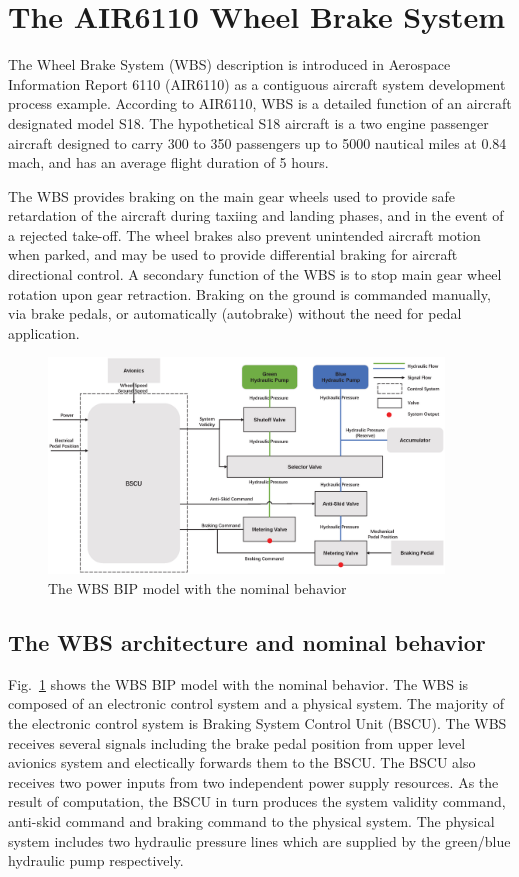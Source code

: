 

\section{The AIR6110 Wheel Brake System}

The Wheel Brake System (WBS) description is introduced in Aerospace Information Report 6110 (AIR6110) as a contiguous aircraft system development process example. According to AIR6110, WBS is a detailed function of an aircraft designated model S18. The hypothetical S18 aircraft is a two engine passenger aircraft designed to carry 300 to 350 passengers up to 5000 nautical miles at 0.84 mach, and has an average flight duration of 5 hours.

The WBS provides braking on the main gear wheels used to provide safe retardation of the aircraft during taxiing and landing phases, and in the event of a rejected take-off. The wheel brakes also prevent unintended aircraft motion when parked, and may be used to provide differential braking for aircraft directional control. A secondary function of the WBS is to stop main gear wheel rotation upon gear retraction. Braking on the ground is commanded manually, via brake pedals, or automatically (autobrake) without the need for pedal application.

\begin{figure}
	\centerline{\includegraphics[width=105mm]{figure/Nominal.eps}}
	\caption{The WBS BIP model with the nominal behavior} \label{WBS_BIP_Nominal}
\end{figure}

\subsection{The WBS architecture and nominal behavior}

Fig.~\ref{WBS_BIP_Nominal} shows the WBS BIP model with the nominal behavior. The WBS is composed of an electronic control system and a physical system. The majority of the electronic control system is Braking System Control Unit (BSCU). The WBS receives several signals including the brake pedal position from upper level avionics system and electically forwards them to the BSCU. The BSCU also receives two power inputs from two independent power supply resources. As the result of computation, the BSCU in turn produces the system validity command, anti-skid command and braking command to the physical system. The physical system includes two hydraulic pressure lines which are supplied by the green/blue hydraulic pump respectively.

